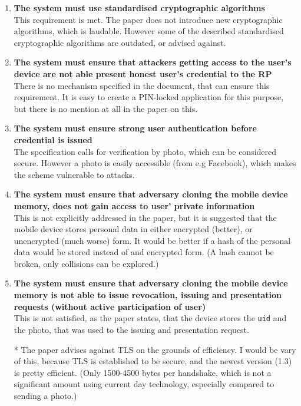 \documentclass{article}
\begin{document}
\begin{enumerate}
		\item\textbf{The system must use standardised cryptographic algorithms}\\
		This requirement is met. The paper does not introduce new cryptographic algorithms, which is laudable. However some of the described standardised cryptographic algorithms are outdated, or advised against.
		
		\item\textbf{The system must ensure that attackers getting access to the user’s device are not able present honest user’s credential to the RP}\\
		There is no mechanism specified in the document, that can ensure this requirement. It is easy to create a PIN-locked application for this purpose, but there is no mention at all in the paper on this.
		
		\item\textbf{The system must ensure strong user authentication before credential is issued}\\
		The specification calls for verification by photo, which can be considered secure. \cite{photo} However a photo is easily accessible (from e.g Facebook), which makes the scheme vulnerable to attacks.
		
		\item\textbf{The system must ensure that adversary cloning the mobile device memory, does not gain access to user’ private information}\\
		This is not explicitly addressed in the paper, but it is suggested that the mobile device stores personal data in either encrypted (better), or unencrypted (much worse) form. It would be better if a hash of the personal data would be stored instead of and encrypted form. (A hash cannot be broken, only collisions can be explored.)
		
		\item\textbf{The system must ensure that adversary cloning the mobile device memory is not able to issue revocation, issuing and presentation requests (without active participation of user)}\\
		This is not satisfied, as the paper states, that the device stores the \texttt{uid} and the photo, that was used to the issuing and presentation request.
		
		\item[*] The paper advises against TLS on the grounds of efficiency. I would be vary of this, because TLS is established to be secure, and the newest version (1.3) is pretty efficient. (Only 1500-4500 bytes per handshake, which is not a significant amount using current day technology, especially compared to sending a photo.) \cite{tls_rfc}
	\end{enumerate}
\end{document}
